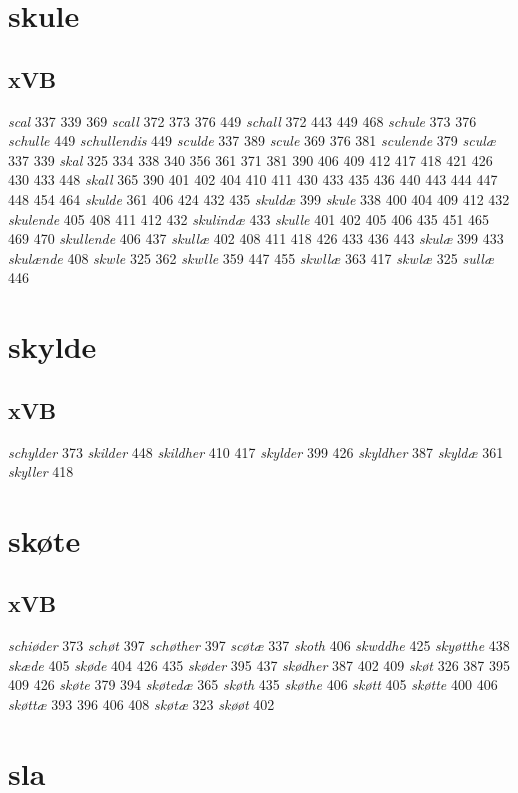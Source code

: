 \documentclass[a4paper,twocolumn]{article}
\begin{document}
\section{skule}
\label{sec:orgf71dada}
\subsection{xVB}
\label{sec:orgfad090a}
\emph{scal} 337 339 369 \emph{scall} 372 373 376 449 \emph{schall} 372 443 449 468 \emph{schule} 373 376 \emph{schulle} 449 \emph{schullendis} 449 \emph{sculde} 337 389 \emph{scule} 369 376 381 \emph{sculende} 379 \emph{sculæ} 337 339 \emph{skal} 325 334 338 340 356 361 371 381 390 406 409 412 417 418 421 426 430 433 448 \emph{skall} 365 390 401 402 404 410 411 430 433 435 436 440 443 444 447 448 454 464 \emph{skulde} 361 406 424 432 435 \emph{skuldæ} 399 \emph{skule} 338 400 404 409 412 432 \emph{skulende} 405 408 411 412 432 \emph{skulindæ} 433 \emph{skulle} 401 402 405 406 435 451 465 469 470 \emph{skullende} 406 437 \emph{skullæ} 402 408 411 418 426 433 436 443 \emph{skulæ} 399 433 \emph{skulænde} 408 \emph{skwle} 325 362 \emph{skwlle} 359 447 455 \emph{skwllæ} 363 417 \emph{skwlæ} 325 \emph{sullæ} 446 
\section{skylde}
\label{sec:orgf990d58}
\subsection{xVB}
\label{sec:org6ae88d6}
\emph{schylder} 373 \emph{skilder} 448 \emph{skildher} 410 417 \emph{skylder} 399 426 \emph{skyldher} 387 \emph{skyldæ} 361 \emph{skyller} 418 
\section{skøte}
\label{sec:org8b10c3f}
\subsection{xVB}
\label{sec:orgd3e483b}
\emph{schiøder} 373 \emph{schøt} 397 \emph{schøther} 397 \emph{scøtæ} 337 \emph{skoth} 406 \emph{skwddhe} 425 \emph{skyøtthe} 438 \emph{skæde} 405 \emph{skøde} 404 426 435 \emph{skøder} 395 437 \emph{skødher} 387 402 409 \emph{skøt} 326 387 395 409 426 \emph{skøte} 379 394 \emph{skøtedæ} 365 \emph{skøth} 435 \emph{skøthe} 406 \emph{skøtt} 405 \emph{skøtte} 400 406 \emph{skøttæ} 393 396 406 408 \emph{skøtæ} 323 \emph{skøøt} 402 
\section{sla}
\label{sec:orge063f44}
\end{document}
